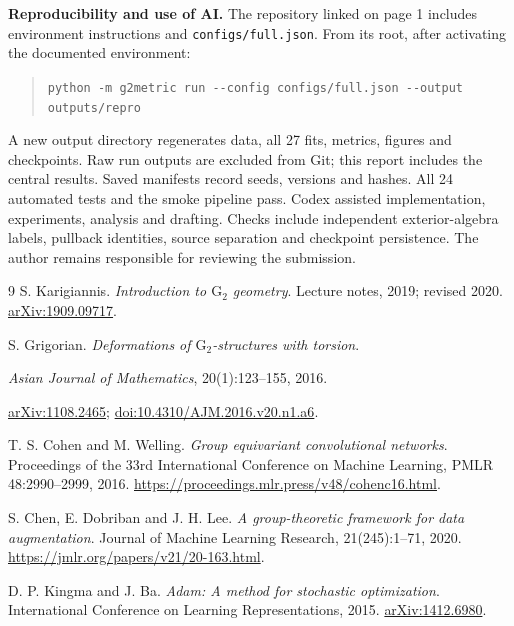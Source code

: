 \documentclass[a4paper,11pt]{article}
\newcommand{\Gtwo}{\mathrm{G}_2}
\begin{document}
\textbf{Reproducibility and use of AI.}
The repository linked on page 1 includes environment instructions and
\texttt{configs/full.json}. From its root, after activating the documented environment:
\begin{quote}\small
\verb|python -m g2metric run --config configs/full.json --output outputs/repro|
\end{quote}
A new output directory regenerates data, all 27 fits, metrics, figures and
checkpoints. Raw run outputs are excluded
from Git; this report includes the central results. Saved manifests record seeds,
versions and hashes. All 24 automated tests and the smoke pipeline pass.
Codex assisted implementation, experiments, analysis and drafting. Checks include
independent exterior-algebra labels, pullback identities, source separation and
checkpoint persistence. The author remains responsible for reviewing the submission.

\newpage
\begin{thebibliography}{9}
S. Karigiannis.
\emph{Introduction to $\Gtwo$ geometry}.
Lecture notes, 2019; revised 2020.
\href{https://arxiv.org/abs/1909.09717}{arXiv:1909.09717}.

S. Grigorian.
\emph{Deformations of $\Gtwo$-structures with torsion}.\par
\emph{Asian Journal of Mathematics}, 20(1):123--155, 2016.\par
\href{https://arxiv.org/abs/1108.2465}{arXiv:1108.2465};
\href{https://doi.org/10.4310/AJM.2016.v20.n1.a6}{doi:10.4310/AJM.2016.v20.n1.a6}.

T. S. Cohen and M. Welling.
\emph{Group equivariant convolutional networks}.
Proceedings of the 33rd International Conference on Machine Learning,
PMLR 48:2990--2999, 2016.
\url{https://proceedings.mlr.press/v48/cohenc16.html}.

S. Chen, E. Dobriban and J. H. Lee.
\emph{A group-theoretic framework for data augmentation}.
Journal of Machine Learning Research, 21(245):1--71, 2020.
\url{https://jmlr.org/papers/v21/20-163.html}.

D. P. Kingma and J. Ba.
\emph{Adam: A method for stochastic optimization}.
International Conference on Learning Representations, 2015.
\href{https://arxiv.org/abs/1412.6980}{arXiv:1412.6980}.
\end{thebibliography}
\end{document}
